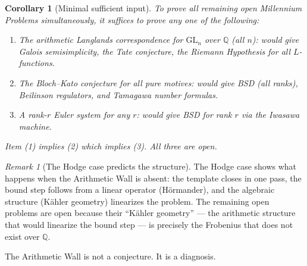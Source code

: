\documentclass[12pt]{article}
\newtheorem{corollary}[theorem]{Corollary}
\theoremstyle{definition}
\theoremstyle{remark}
\newtheorem{remark}[theorem]{Remark}
\begin{document}
\begin{corollary}[Minimal sufficient input]\label{cor:sufficient}
To prove all remaining open Millennium Problems simultaneously,
it suffices to prove any one of the following:
\begin{enumerate}
\item The arithmetic Langlands correspondence for $\mathrm{GL}_n$ over $\mathbb{Q}$
  (all $n$): would give Galois semisimplicity, the Tate conjecture, the
  Riemann Hypothesis for all $L$-functions.
\item The Bloch--Kato conjecture for all pure motives: would give BSD (all ranks),
  Beilinson regulators, and Tamagawa number formulas.
\item A rank-$r$ Euler system for any $r$: would give BSD for rank $r$ via
  the Iwasawa machine.
\end{enumerate}
Item (1) implies (2) which implies (3). All three are open.
\end{corollary}

\begin{remark}[The Hodge case predicts the structure]
The Hodge case shows what happens when the Arithmetic Wall is absent:
the template closes in one pass, the bound step follows from a linear operator
(Hörmander), and the algebraic structure (Kähler geometry) linearizes the
problem. The remaining open problems are open because their ``Kähler geometry''
--- the arithmetic structure that would linearize the bound step --- is precisely
the Frobenius that does not exist over $\mathbb{Q}$.

The Arithmetic Wall is not a conjecture. It is a diagnosis.
\end{remark}
\end{document}
